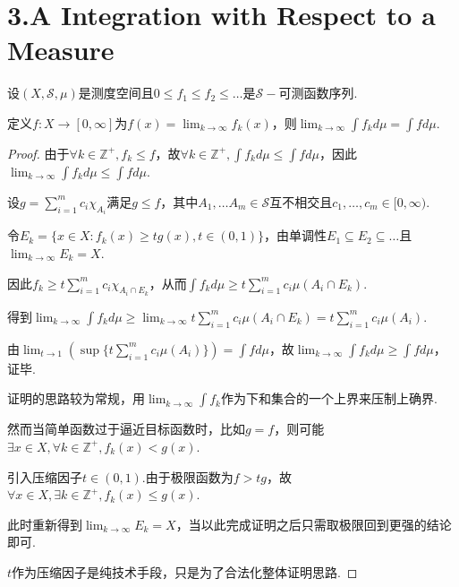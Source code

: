 \section{3.A Integration with Respect to a Measure}

\begin{theorem}[3.11]\label{3.11}
    设\((X, \mathcal{S}, \mu)\)是测度空间且\(0 \leq f_1 \leq f_2 \leq \dots\)是\(\mathcal{S}-\)可测函数序列.

    定义\(f: X \to [0,\infty]\)为\(f(x)=\lim_{k \to \infty}f_k(x)\)，则\(\lim_{k \to \infty} \int f_k d\mu=\int f d\mu\).
\end{theorem}

\begin{proof}
    由于\(\forall k \in \mathbb{Z}^+, f_k \leq f\)，故\(\forall k \in \mathbb{Z}^+, \int f_k d\mu \leq \int f d\mu\)，因此\(\lim_{k \to \infty} \int f_k d\mu \leq \int f d\mu\).

    设\(g=\sum_{i=1}^m c_i\chi_{A_i}\)满足\(g \leq f\)，其中\(A_1, \dots A_m \in \mathcal{S}\)互不相交且\(c_1, \dots, c_m \in [0, \infty)\).

    令\(E_k=\{x \in X: f_k(x) \geq tg(x), t \in (0,1)\}\)，由单调性\(E_1 \subseteq E_2 \subseteq \dots\)且\(\lim_{k \to \infty}E_k=X\).

    因此\(f_k \geq t\sum_{i=1}^m c_i\chi_{A_i \cap E_k}\)，从而\(\int f_k d\mu \geq t\sum_{i=1}^m c_i\mu(A_i \cap E_k)\).

    得到\(\lim_{k \to \infty} \int f_k d\mu \geq \lim_{k \to \infty} t\sum_{i=1}^m c_i\mu(A_i \cap E_k)=t\sum_{i=1}^m c_i\mu(A_i)\).

    由\(\lim_{t \to 1}(\sup \{t\sum_{i=1}^m c_i\mu(A_i)\})=\int f d\mu\)，故\(\lim_{k \to \infty} \int f_k d\mu \geq \int f d\mu\)，证毕.

    {\kaishu 证明的思路较为常规，用\(\lim_{k \to \infty} \int f_k\)作为下和集合的一个上界来压制上确界.
    
    然而当简单函数过于逼近目标函数时，比如\(g=f\)，则可能\(\exists x \in X, \forall k \in \mathbb{Z}^+, f_k(x)<g(x)\).
    
    引入压缩因子\(t \in (0,1)\).由于极限函数为\(f>tg\)，故\(\forall x \in X, \exists k \in \mathbb{Z}^+, f_k(x) \leq g(x)\).
    
    此时重新得到\(\lim_{k \to \infty}E_k=X\)，当以此完成证明之后只需取极限回到更强的结论即可.
    
    \(t\)作为压缩因子是纯技术手段，只是为了合法化整体证明思路.}
\end{proof}

